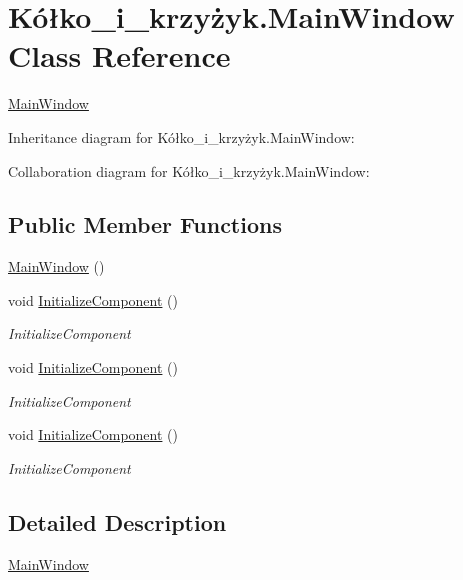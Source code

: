 \hypertarget{class_k_xC3_xB3_xC5_x82ko__i__krzy_xC5_xBCyk_1_1_main_window}{}\section{Kółko\+\_\+i\+\_\+krzyżyk.\+Main\+Window Class Reference}
\label{class_k_xC3_xB3_xC5_x82ko__i__krzy_xC5_xBCyk_1_1_main_window}


\hyperlink{class_k_xC3_xB3_xC5_x82ko__i__krzy_xC5_xBCyk_1_1_main_window}{Main\+Window}  




Inheritance diagram for Kółko\+\_\+i\+\_\+krzyżyk.\+Main\+Window\+:


Collaboration diagram for Kółko\+\_\+i\+\_\+krzyżyk.\+Main\+Window\+:
\subsection*{Public Member Functions}
\begin{DoxyCompactItemize}
\item 
\hyperlink{class_k_xC3_xB3_xC5_x82ko__i__krzy_xC5_xBCyk_1_1_main_window_a458dbe98107b89c11edbc44e11e21f67}{Main\+Window} ()
\item 
void \hyperlink{class_k_xC3_xB3_xC5_x82ko__i__krzy_xC5_xBCyk_1_1_main_window_a6e1ed799456bf3fe5b1be74d7ae956b3}{Initialize\+Component} ()
\begin{DoxyCompactList}\small\item\em Initialize\+Component \end{DoxyCompactList}\item 
void \hyperlink{class_k_xC3_xB3_xC5_x82ko__i__krzy_xC5_xBCyk_1_1_main_window_a6e1ed799456bf3fe5b1be74d7ae956b3}{Initialize\+Component} ()
\begin{DoxyCompactList}\small\item\em Initialize\+Component \end{DoxyCompactList}\item 
void \hyperlink{class_k_xC3_xB3_xC5_x82ko__i__krzy_xC5_xBCyk_1_1_main_window_a6e1ed799456bf3fe5b1be74d7ae956b3}{Initialize\+Component} ()
\begin{DoxyCompactList}\small\item\em Initialize\+Component \end{DoxyCompactList}\end{DoxyCompactItemize}


\subsection{Detailed Description}
\hyperlink{class_k_xC3_xB3_xC5_x82ko__i__krzy_xC5_xBCyk_1_1_main_window}{Main\+Window} 



